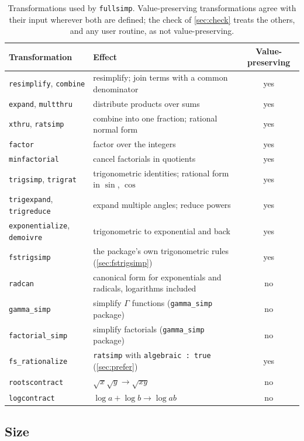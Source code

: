 \documentclass[11pt]{amsart}
\newcommand{\mx}{\lstinline[style=mx]}
\theoremstyle{definition}
\theoremstyle{remark}
\begin{document}
\begin{table}[ht]
\caption{Transformations used by \texttt{fullsimp}. Value-preserving
transformations agree with their input wherever both are defined; the check
of \cref{sec:check} treats the others, and any user routine, as not
value-preserving.}
\label{tab:transforms}
\small
\begin{tabular}{@{}l>{\raggedright\arraybackslash}p{}c@{}}
\toprule
Transformation & Effect & Value-preserving \\
\midrule
\mx|resimplify|, \mx|combine| & resimplify; join terms with a common denominator & yes \\
\mx|expand|, \mx|multthru| & distribute products over sums & yes \\
\mx|xthru|, \mx|ratsimp| & combine into one fraction; rational normal form & yes \\
\mx|factor| & factor over the integers & yes \\
\mx|minfactorial| & cancel factorials in quotients & yes \\
\mx|trigsimp|, \mx|trigrat| & trigonometric identities; rational form in $\sin$, $\cos$ & yes \\
\mx|trigexpand|, \mx|trigreduce| & expand multiple angles; reduce powers & yes \\
\mx|exponentialize|, \mx|demoivre| & trigonometric to exponential and back & yes \\
\mx|fstrigsimp| & the package's own trigonometric rules (\cref{sec:fstrigsimp}) & yes \\
\mx|radcan| & canonical form for exponentials and radicals, logarithms included & no \\
\mx|gamma_simp| & simplify $\Gamma$ functions (\texttt{gamma\_simp} package) & no \\
\mx|factorial_simp| & simplify factorials (\texttt{gamma\_simp} package) & no \\
\mx|fs_rationalize| & \mx|ratsimp| with \mx|algebraic : true| (\cref{sec:prefer}) & yes \\
\mx|rootscontract| & $\sqrt{x}\sqrt{y} \to \sqrt{xy}$ & no \\
\mx|logcontract| & $\log a + \log b \to \log ab$ & no \\
\bottomrule
\end{tabular}
\end{table}

\subsection{Size}
\end{document}
